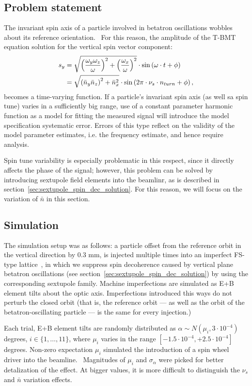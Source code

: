 
\subsection{Problem statement}
The invariant spin axis of a particle involved in betatron oscillations wobbles
about its reference orientation.~\cite[p.~11]{Shatunov} For this reason, the amplitude of the T-BMT equation
solution for the vertical spin vector component:
\begin{align}
s_y &= \sqrt{\bkt{\frac{\w_y\w_z}{\w}}^2 + \bkt{\frac{\w_x}{\w}}^2}\cdot\sin\bkt{\w\cdot t + \phi}\notag\\
&= \sqrt{\bkt{\bar n_y\bar n_z}^2 + \bar n_x^2} \cdot \sin\bkt{2\pi\cdot\nu_s\cdot n_{turn} + \phi},\label{eq:sy_varying_amplitude}
\end{align}
becomes a time-varying function. If a particle's invariant spin axis (as well sa spin tune) varies in
a sufficiently big range, use of a constant parameter harmonic function as a model
for fitting the measured signal will introduce the model specification systematic error.
Errors of this type reflect on the validity of the model parameter estimates, i.e. the frequency estimate,
and hence require analysis.

Spin tune variability is especially problematic in this respect,
since it directly affects the phase of the signal; however, this problem can be solved
by introducing sextupole field elements into the beamlinr, as is described
in section~\ref{sec:sextupole_spin_dec_solution}. For this reason, we will focus on the variation of
$\bar n$ in this section.

\subsection{Simulation}
The simulation setup was as follows: a particle offset from the reference orbit in the vertical direction
by 0.3 mm, is injected multiple times into an imperfect FS-type lattice~\cite{Senichev:Lattices},
in which we suppress spin decoherence caused by vertical plane betatron oscillations
(see section~\ref{sec:sextupole_spin_dec_solution})  by using the corresponding sextupole family.
Machine imperfections are simulated as E+B element tilts about the optic axis.
Imperfections introduced this ways do not perturb the closed orbit (that is,
the reference orbit --- as well as the orbit of the betatron-oscillating particle ---
is the same for every injection.)

Each trial, E+B element tilts are randomly distributed as $\alpha\sim N(\mu_i, 3\cdot 10^{-4})$ degrees,
$i\in\{1,\dots,11\}$, where $\mu_i$ varies in the range $[-1.5\cdot10^{-4}, +2.5\cdot10^{-4}]$ degrees.
Non-zero expectation $\mu_i$ simulated the introduction of a spin wheel driver
into the beamline.~\cite{Koop:SpinWheel} Magnitudes of $\mu_i$ and $\sigma_{\alpha}$
were picked for better detalization of the effect. At bigger values, it is more difficult to distinguish
the $\nu_s$ and $\bar n$ variation effects.

